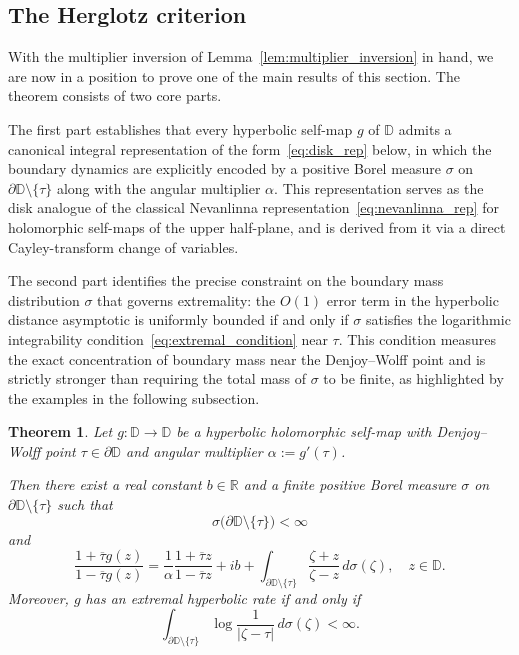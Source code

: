 \documentclass[10pt,a4paper]{amsart}
\numberwithin{equation}{section}
\newtheorem{theorem}[equation]{Theorem}
\begin{document}
\subsection{The Herglotz criterion}
\label{subsec:herglotz_criterion}
With the multiplier inversion of Lemma~\ref{lem:multiplier_inversion} in hand, we are now in a position to prove one of the main results of this section. The theorem consists of two core parts.

The first part establishes that every hyperbolic self-map $g$ of $\mathbb{D}$ admits a canonical integral representation of the form~\eqref{eq:disk_rep} below, in which the boundary dynamics are explicitly encoded by a positive Borel measure $\sigma$ on $\partial\mathbb{D}\setminus\{\tau\}$ along with the angular multiplier $\alpha$. This representation serves as the disk analogue of the classical Nevanlinna representation~\eqref{eq:nevanlinna_rep} for holomorphic self-maps of the upper half-plane, and is derived from it via a direct Cayley-transform change of variables.

The second part identifies the precise constraint on the boundary mass distribution $\sigma$ that governs extremality: the $O(1)$ error term in the hyperbolic distance asymptotic is uniformly bounded if and only if $\sigma$ satisfies the logarithmic integrability condition~\eqref{eq:extremal_condition} near $\tau$. This condition measures the exact concentration of boundary mass near the Denjoy--Wolff point and is strictly stronger than requiring the total mass of $\sigma$ to be finite, as highlighted by the examples in the following subsection.

\begin{theorem}
\label{thm:herglotz_criterion}
Let $g:\mathbb{D}\to\mathbb{D}$ be a hyperbolic holomorphic self-map
with Denjoy--Wolff point $\tau\in\partial\mathbb{D}$ and angular
multiplier $\alpha:=g'(\tau)$.

Then there exist a real constant $b\in\mathbb{R}$ and a finite positive
Borel measure $\sigma$ on
$\partial\mathbb{D}\setminus\{\tau\}$ such that
\begin{equation*}
\label{eq:sigma_integrability}
\sigma\bigl(\partial\mathbb{D}\setminus\{\tau\}\bigr)<\infty
\end{equation*}
and
\begin{equation}
\label{eq:disk_rep}
\frac{1+\overline{\tau}g(z)}
     {1-\overline{\tau}g(z)}
=
\frac{1}{\alpha}
\frac{1+\overline{\tau}z}
     {1-\overline{\tau}z}
+ib
+\int_{\partial\mathbb{D}\setminus\{\tau\}}
\frac{\zeta+z}{\zeta-z}\,d\sigma(\zeta),
\quad z\in\mathbb{D}.
\end{equation}
Moreover, $g$ has an extremal hyperbolic rate if and only if
\begin{equation}
\label{eq:extremal_condition}
\int_{\partial\mathbb{D}\setminus\{\tau\}}
\log\frac{1}{|\zeta-\tau|}\,d\sigma(\zeta)
<\infty.
\end{equation}
\end{theorem}
\end{document}
